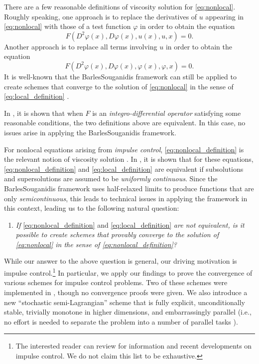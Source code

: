 \documentclass[12pt]{article}
\begin{document}
There are a few reasonable definitions of viscosity solution for \eqref{eq:nonlocal}.
Roughly speaking, one approach is to replace the derivatives of $u$
appearing in \eqref{eq:nonlocal} with those of a test function $\varphi$
in order to obtain the equation 
\begin{equation}
F(D^{2}\varphi(x),D\varphi(x),u(x),u,x)=0.\tag{def. 1}\label{eq:nonlocal_definition}
\end{equation}
Another approach is to replace all terms involving $u$ in order to
obtain the equation 
\begin{equation}
F(D^{2}\varphi(x),D\varphi(x),\varphi(x),\varphi,x)=0.\tag{def. 2}\label{eq:local_definition}
\end{equation}
It is well-known that the Barles\textendash Souganidis framework can
still be applied to create schemes that converge to the solution of
\eqref{eq:nonlocal} in the sense of \eqref{eq:local_definition} \cite{MR2182141}.

In \cite[Pg. 300]{MR1395674}, it is shown that when $F$ is an \emph{integro-differential
operator} satisfying some reasonable conditions, the two definitions
above are equivalent. In this case, no issues arise in applying the
Barles\textendash Souganidis framework.

For nonlocal equations arising from \emph{impulse control}, \eqref{eq:nonlocal_definition}
is the relevant notion of viscosity solution \cite{MR2568293}. In
\cite[Theorem 3.1]{MR2486085}, it is shown that for these equations,
\eqref{eq:nonlocal_definition} and \eqref{eq:local_definition} are
equivalent if subsolutions and supersolutions are assumed to be \emph{uniformly
continuous}. Since the Barles\textendash Souganidis framework uses
half-relaxed limits to produce functions that are only \emph{semicontinuous},
this leads to technical issues in applying the framework in this context,
leading us to the following natural question:
\begin{enumerate}[label=(Q)]
\item \emph{\label{enu:question}If }\eqref{eq:nonlocal_definition} and
\eqref{eq:local_definition}\emph{ are not equivalent, is it possible
to create schemes that provably converge to the solution of \eqref{eq:nonlocal}
in the sense of \eqref{eq:nonlocal_definition}?}
\end{enumerate}
While our answer to the above question is general, our driving motivation
is impulse control.\footnote{The interested reader can review \cite{MR673169,MR1240006,MR1306930,MR2109687,MR2568293,MR2735526,MR2812853,MR3053571,MR3070528,MR3071398,MR3145856,MR3200009,MR3615458,MR3626187}
for information and recent developments on impulse control. We do
not claim this list to be exhaustive.} In particular, we apply our findings to prove the convergence of
various schemes for impulse control problems.
Two of these schemes were implemented in \cite{MR3493959}, though no convergence proofs were given.
We also introduce a new ``stochastic
semi-Lagrangian'' scheme that is fully explicit, unconditionally stable,
trivially monotone in higher dimensions, and embarrassingly parallel
(i.e., no effort is needed to separate the problem into a number of
parallel tasks \cite{herlihy2012art}).
\end{document}

